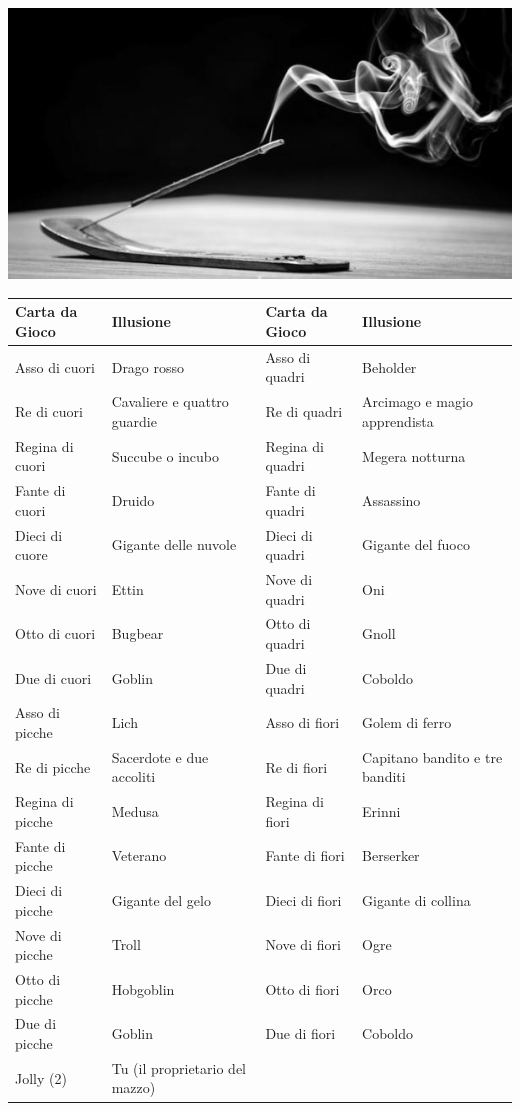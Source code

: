 \medskip

\begin{center}
\includegraphics[width=0.55\linewidth]{immagini/Incenso.png}

\end{center}

\begin{tabular}{ll|ll}
\textbf{Carta da Gioco}& \textbf{Illusione}&\textbf{Carta da Gioco}& \textbf{Illusione}\\
\hline
Asso di cuori &Drago rosso&Asso di quadri& Beholder\\
Re di cuori &Cavaliere e quattro guardie&Re di quadri & Arcimago e magio apprendista\\
Regina di cuori &Succube o incubo&Regina di quadri &Megera notturna\\
Fante di cuori &Druido&Fante di quadri &Assassino\\
Dieci di cuore &Gigante delle nuvole&Dieci di quadri &Gigante del fuoco\\
Nove di cuori &Ettin&Nove di quadri &Oni\\
Otto di cuori& Bugbear&Otto di quadri &Gnoll\\
Due di cuori &Goblin&Due di quadri &Coboldo\\
Asso di picche &Lich&Asso di fiori& Golem di ferro\\
Re di picche &Sacerdote e due accoliti&Re di fiori &Capitano bandito e tre banditi\\
Regina di picche& Medusa&Regina di fiori &Erinni\\
Fante di picche &Veterano&Fante di fiori &Berserker\\
Dieci di picche &Gigante del gelo&Dieci di fiori &Gigante di collina\\
Nove di picche &Troll&Nove di fiori &Ogre\\
Otto di picche &Hobgoblin&Otto di fiori& Orco\\
Due di picche &Goblin&Due di fiori &Coboldo\\
Jolly (2) &Tu (il proprietario del mazzo)&&\\
\end{tabular}

